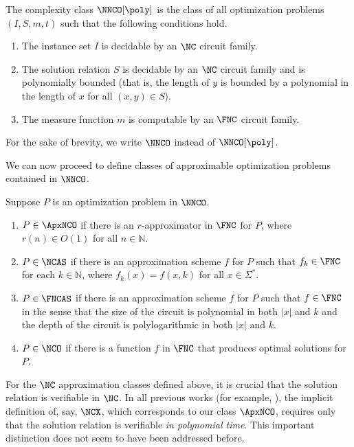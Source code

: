\begin{definition}\label{def:nnco}
  The complexity class $\NNCO[\poly]$ is the class of all optimization problems $(I, S, m, t)$ such that the following conditions hold.
  \begin{enumerate}
  \item The instance set $I$ is decidable by an $\NC$ circuit family.
  \item The solution relation $S$ is decidable by an $\NC$ circuit family and is polynomially bounded (that is, the length of $y$ is bounded by a polynomial in the length of $x$ for all $(x, y)\in S$).
  \item The measure function $m$ is computable by an $\FNC$ circuit family.
  \end{enumerate}
  For the sake of brevity, we write $\NNCO$ instead of $\NNCO[\poly]$.
\end{definition}

We can now proceed to define classes of approximable optimization problems contained in $\NNCO$.

\begin{definition}\label{def:ncx}
  Suppose $P$ is an optimization problem in $\NNCO$.
  \begin{enumerate}
  \item $P \in \ApxNCO$ if there is an $r$-approximator in $\FNC$ for $P$, where $r(n) \in O(1)$ for all $n \in \mathbb{N}$.
  \item $P \in \NCAS$ if there is an approximation scheme $f$ for $P$ such that $f_k \in \FNC$ for each $k \in \mathbb{N}$, where $f_k(x) = f(x, k)$ for all $x \in \Sigma^*$.
  \item $P \in \FNCAS$ if there is an approximation scheme $f$ for $P$ such that $f \in \FNC$ in the sense that the size of the circuit is polynomial in both $|x|$ and $k$ and the depth of the circuit is polylogarithmic in both $|x|$ and $k$.
  \item $P \in \NCO$ if there is a function $f$ in $\FNC$ that produces optimal solutions for $P$.
  \end{enumerate}
\end{definition}

For the $\NC$ approximation classes defined above, it is crucial that the solution relation is verifiable in $\NC$.
In all previous works (for example, \cite{dsst97, sx95}), the implicit definition of, say, $\NCX$, which corresponds to our class $\ApxNCO$, requires only that the solution relation is verifiable \emph{in polynomial time}.
This important distinction does not seem to have been addressed before.

